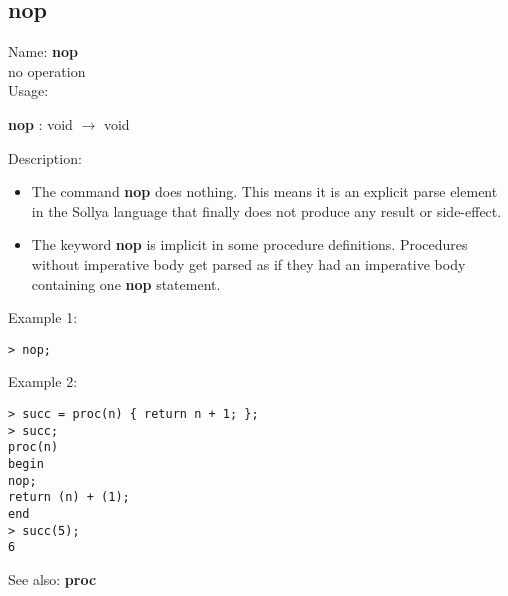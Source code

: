 \subsection{ nop }
\noindent Name: \textbf{nop}\\
no operation\\

\noindent Usage: 
\begin{center}
\textbf{nop} : \textsf{void} $\rightarrow$ \textsf{void}\\
\end{center}
\noindent Description: \begin{itemize}

\item The command \textbf{nop} does nothing. This means it is an explicit parse
   element in the Sollya language that finally does not produce any
   result or side-effect.

\item The keyword \textbf{nop} is implicit in some procedure
   definitions. Procedures without imperative body get parsed as if they
   had an imperative body containing one \textbf{nop} statement.
\end{itemize}
\noindent Example 1: 
\begin{center}\begin{minipage}{15cm}\begin{Verbatim}[frame=single]
> nop;
\end{Verbatim}
\end{minipage}\end{center}
\noindent Example 2: 
\begin{center}\begin{minipage}{15cm}\begin{Verbatim}[frame=single]
> succ = proc(n) { return n + 1; };
> succ;
proc(n)
begin
nop;
return (n) + (1);
end
> succ(5);
6
\end{Verbatim}
\end{minipage}\end{center}
See also: \textbf{proc}
